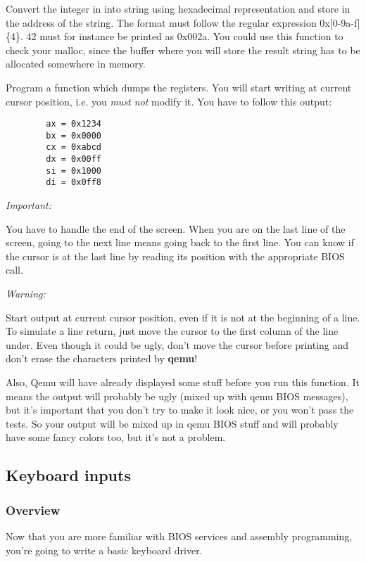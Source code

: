 {
  Convert the integer in  into string using hexadecimal
  representation and store in  the address of the string.
  The format must follow the regular expression 0x[0-9a-f]\{4\}.
  42 must for instance be printed as 0x002a. You could use this function
  to check your malloc, since the buffer where you will store the result
  string has to be allocated somewhere in memory.
}

{
  Program a function which dumps the registers. You will start writing
  at current cursor position, i.e. you \emph{must not} modify it. You have to
  follow this output:
}
\begin{verbatim}
        ax = 0x1234
        bx = 0x0000
        cx = 0xabcd
        dx = 0x00ff
        si = 0x1000
        di = 0x0ff8
\end{verbatim}

\command{}
{
  {\em Important:}

  You have to handle the end of the screen. When you are on the last line of
  the screen, going to the next line means going back to the first line.
  You can know if the cursor is at the last line by reading its position
  with the appropriate BIOS call.

  {\em Warning:}

  Start output at current cursor position, even if it is not at the beginning
  of a line. To simulate a line return, just move
  the cursor to the first column of the line under. Even though it could be
  ugly, don't move the cursor before printing and don't erase the characters
  printed by \textbf{qemu}!

  Also, Qemu will have already displayed some stuff before you run this
  function. It means the output will probably be ugly (mixed up with qemu BIOS
  messages), but it's important that you don't try to make it look nice, or
  you won't pass the tests. So your output will be mixed up in qemu BIOS stuff
  and will probably have some fancy colors too, but it's not a problem.
}

%
%

\newpage

\subsection{Keyboard inputs}

\subsubsection*{Overview}
Now that you are more familiar with BIOS services and assembly programming,
you're going to write a basic keyboard driver.

